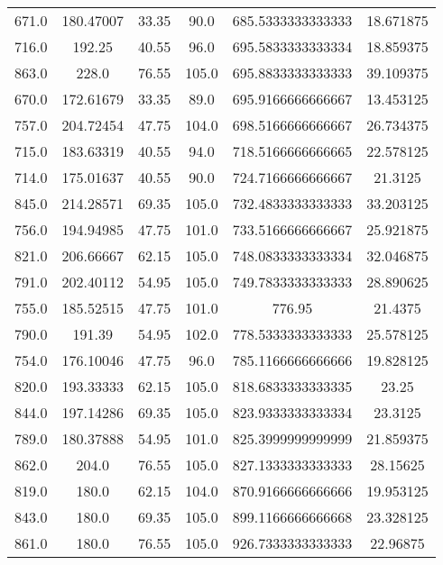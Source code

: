 \begin{table}
\begin{tabular}{cccccc}
671.0 & 180.47007 & 33.35 & 90.0 & 685.5333333333333 & 18.671875 \\
716.0 & 192.25 & 40.55 & 96.0 & 695.5833333333334 & 18.859375 \\
863.0 & 228.0 & 76.55 & 105.0 & 695.8833333333333 & 39.109375 \\
670.0 & 172.61679 & 33.35 & 89.0 & 695.9166666666667 & 13.453125 \\
757.0 & 204.72454 & 47.75 & 104.0 & 698.5166666666667 & 26.734375 \\
715.0 & 183.63319 & 40.55 & 94.0 & 718.5166666666665 & 22.578125 \\
714.0 & 175.01637 & 40.55 & 90.0 & 724.7166666666667 & 21.3125 \\
845.0 & 214.28571 & 69.35 & 105.0 & 732.4833333333333 & 33.203125 \\
756.0 & 194.94985 & 47.75 & 101.0 & 733.5166666666667 & 25.921875 \\
821.0 & 206.66667 & 62.15 & 105.0 & 748.0833333333334 & 32.046875 \\
791.0 & 202.40112 & 54.95 & 105.0 & 749.7833333333333 & 28.890625 \\
755.0 & 185.52515 & 47.75 & 101.0 & 776.95 & 21.4375 \\
790.0 & 191.39 & 54.95 & 102.0 & 778.5333333333333 & 25.578125 \\
754.0 & 176.10046 & 47.75 & 96.0 & 785.1166666666666 & 19.828125 \\
820.0 & 193.33333 & 62.15 & 105.0 & 818.6833333333335 & 23.25 \\
844.0 & 197.14286 & 69.35 & 105.0 & 823.9333333333334 & 23.3125 \\
789.0 & 180.37888 & 54.95 & 101.0 & 825.3999999999999 & 21.859375 \\
862.0 & 204.0 & 76.55 & 105.0 & 827.1333333333333 & 28.15625 \\
819.0 & 180.0 & 62.15 & 104.0 & 870.9166666666666 & 19.953125 \\
843.0 & 180.0 & 69.35 & 105.0 & 899.1166666666668 & 23.328125 \\
861.0 & 180.0 & 76.55 & 105.0 & 926.7333333333333 & 22.96875 \\
\end{tabular}
\end{table}
